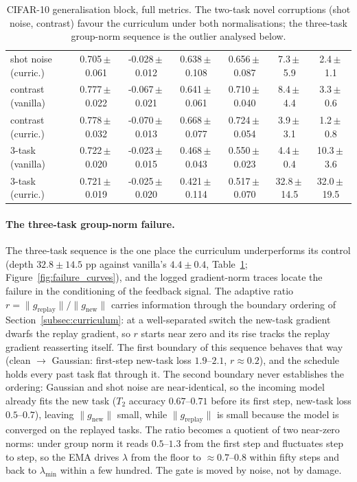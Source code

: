 \begin{table}[H]
\begin{tabular}{l ccc c cc}
        shot noise (curric.) & 0.705\,$\pm$\,0.061 & -0.028\,$\pm$\,0.012 & 0.638\,$\pm$\,0.108 & 0.656\,$\pm$\,0.087 & 7.3\,$\pm$\,5.9   & 2.4\,$\pm$\,1.1   \\
        contrast (vanilla)   & 0.777\,$\pm$\,0.022 & -0.067\,$\pm$\,0.021 & 0.641\,$\pm$\,0.061 & 0.710\,$\pm$\,0.040 & 8.4\,$\pm$\,4.4   & 3.3\,$\pm$\,0.6   \\
        contrast (curric.)   & 0.778\,$\pm$\,0.032 & -0.070\,$\pm$\,0.013 & 0.668\,$\pm$\,0.077 & 0.724\,$\pm$\,0.054 & 3.9\,$\pm$\,3.1   & 1.2\,$\pm$\,0.8   \\
        3-task (vanilla)     & 0.722\,$\pm$\,0.020 & -0.023\,$\pm$\,0.015 & 0.468\,$\pm$\,0.043 & 0.550\,$\pm$\,0.023 & 4.4\,$\pm$\,0.4   & 10.3\,$\pm$\,3.6  \\
        3-task (curric.)     & 0.721\,$\pm$\,0.019 & -0.025\,$\pm$\,0.020 & 0.421\,$\pm$\,0.114 & 0.517\,$\pm$\,0.070 & 32.8\,$\pm$\,14.5 & 32.0\,$\pm$\,19.5 \\
        \hline
    \end{tabular}
    \caption{CIFAR-10 generalisation block, full metrics. The two-task novel corruptions (shot noise, contrast) favour the curriculum under both normalisations; the three-task group-norm sequence is the outlier analysed below.}
    \label{tab:app_cifar_gen}
\end{table}

\paragraph{The three-task group-norm failure.} The three-task sequence is the one place the curriculum underperforms its control (depth $32.8 \pm 14.5$ pp against vanilla's $4.4 \pm 0.4$, Table~\ref{tab:app_cifar_gen}; Figure~\ref{fig:failure_curves}), and the logged gradient-norm traces locate the failure in the conditioning of the feedback signal. The adaptive ratio $r = \|g_{\text{replay}}\|/\|g_{\text{new}}\|$ carries information through the boundary ordering of Section~\ref{subsec:curriculum}: at a well-separated switch the new-task gradient dwarfs the replay gradient, so $r$ starts near zero and its rise tracks the replay gradient reasserting itself. The first boundary of this sequence behaves that way (clean $\rightarrow$ Gaussian: first-step new-task loss $1.9$--$2.1$, $r \approx 0.2$), and the schedule holds every past task flat through it. The second boundary never establishes the ordering: Gaussian and shot noise are near-identical, so the incoming model already fits the new task ($T_2$ accuracy $0.67$--$0.71$ before its first step, new-task loss $0.5$--$0.7$), leaving $\|g_{\text{new}}\|$ small, while $\|g_{\text{replay}}\|$ is small because the model is converged on the replayed tasks. The ratio becomes a quotient of two near-zero norms: under group norm it reads $0.5$--$1.3$ from the first step and fluctuates step to step, so the EMA drives $\lambda$ from the floor to ${\approx}0.7$--$0.8$ within fifty steps and back to $\lambda_{\min}$ within a few hundred. The gate is moved by noise, not by damage.

